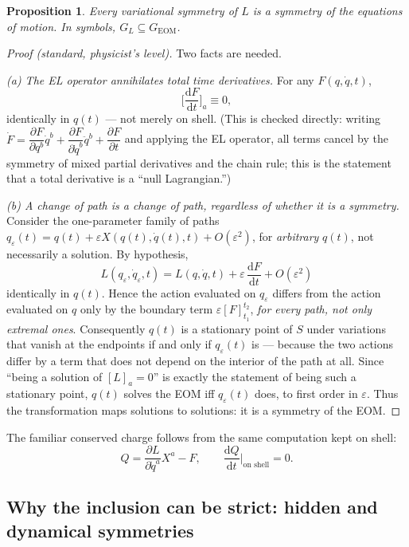 \documentclass[11pt]{article}
\newtheorem{proposition}[theorem]{Proposition}
\theoremstyle{definition}
\theoremstyle{remark}
\newcommand{\dd}{\mathrm{d}}
\newcommand{\pdv}[2]{\dfrac{\partial #1}{\partial #2}}
\newcommand{\dv}[2]{\dfrac{\dd #1}{\dd #2}}
\newcommand{\eps}{\varepsilon}
\newcommand{\GEOM}{G_{\mathrm{EOM}}}
\newcommand{\GL}{G_{L}}
\begin{document}
\begin{proposition}
\label{prop:noether-forward}
Every variational symmetry of $L$ is a symmetry of the equations of motion. In symbols, $\GL \subseteq \GEOM$.
\end{proposition}

\begin{proof}[Proof (standard, physicist's level)]
Two facts are needed.

\emph{(a) The EL operator annihilates total time derivatives.} For any $F(q,\dot q,t)$,
\[
\Big[\dv{F}{t}\Big]_a \equiv 0 ,
\]
identically in $q(t)$ — not merely on shell. (This is checked directly: writing $\dot F = \pdv{F}{q^b}\dot q^b + \pdv{F}{\dot q^b}\ddot q^b + \pdv{F}{t}$ and applying the EL operator, all terms cancel by the symmetry of mixed partial derivatives and the chain rule; this is the statement that a total derivative is a ``null Lagrangian.'')

\emph{(b) A change of path is a change of path, regardless of whether it is a symmetry.} Consider the one-parameter family of paths $q_\eps(t) = q(t) + \eps X(q(t),\dot q(t),t) + O(\eps^2)$, for \emph{arbitrary} $q(t)$, not necessarily a solution. By hypothesis,
\[
L(q_\eps,\dot q_\eps,t) = L(q,\dot q,t) + \eps\,\dv{F}{t} + O(\eps^2)
\]
identically in $q(t)$. Hence the action evaluated on $q_\eps$ differs from the action evaluated on $q$ only by the boundary term $\eps[F]_{t_1}^{t_2}$, \emph{for every path, not only extremal ones}. Consequently $q(t)$ is a stationary point of $S$ under variations that vanish at the endpoints if and only if $q_\eps(t)$ is — because the two actions differ by a term that does not depend on the interior of the path at all. Since ``being a solution of $[L]_a=0$'' is exactly the statement of being such a stationary point, $q(t)$ solves the EOM iff $q_\eps(t)$ does, to first order in $\eps$. Thus the transformation maps solutions to solutions: it is a symmetry of the EOM.
\end{proof}

The familiar conserved charge follows from the same computation kept on shell:
\[
Q = \pdv{L}{\dot q^a} X^a - F, \qquad \dv{Q}{t}\Big|_{\text{on shell}} = 0 .
\]

\subsection{Why the inclusion can be strict: hidden and dynamical symmetries}
\label{sec:hidden}
\end{document}
